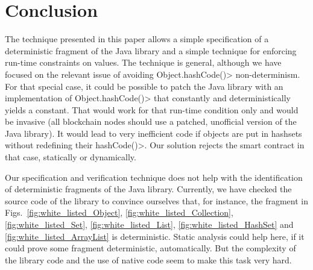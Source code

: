 \section{Conclusion}\label{sec:conclusion}

The technique presented in this paper allows a simple
specification of a deterministic fragment of the Java library and a simple
technique for enforcing run-time constraints on values.
The technique is general, although we have focused on the
relevant issue of avoiding \<Object.hashCode()> non-determinism.
For that special case, it could be possible to patch the Java library
with an implementation of \<Object.hashCode()> that constantly and
deterministically yields a constant. That would work for that run-time condition
only and would be invasive (all blockchain nodes should use a patched,
unofficial version of the Java library). It would lead to very inefficient
code if objects are put in hashsets without redefining their \<hashCode()>.
Our solution rejects the smart contract in that case, statically or dynamically.

Our specification and verification technique does not help with the
identification of deterministic fragments of the Java library. Currently,
we have checked the source code of the library to convince ourselves that,
for instance, the fragment in Figs.~\ref{fig:white_listed_Object}, \ref{fig:white_listed_Collection},
\ref{fig:white_listed_Set}, \ref{fig:white_listed_List},
\ref{fig:white_listed_HashSet} and \ref{fig:white_listed_ArrayList} is deterministic.
Static analysis could help here, if it could prove some fragment deterministic,
automatically. But the complexity of the library code and the use of native code
seem to make this task very hard.
